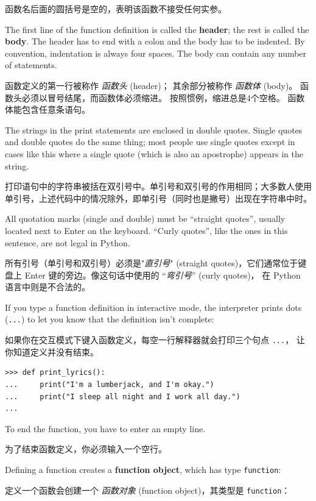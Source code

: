 函数名后面的圆括号是空的，表明该函数不接受任何实参。
  
    

The first line of the function definition is called the {\bf header};
the rest is called the {\bf body}.  The header has to end with a colon
and the body has to be indented.  By convention, indentation is
always four spaces.  The body can contain
any number of statements.

函数定义的第一行被称作 \emph{函数头} (header)； 其余部分被称作 \emph{函数体} (body)。
函数头必须以冒号结尾，而函数体必须缩进。 按照惯例，缩进总是4个空格。 函数体能包含任意条语句。

The strings in the print statements are enclosed in double
quotes.  Single quotes and double quotes do the same thing;
most people use single quotes except in cases like this where
a single quote (which is also an apostrophe) appears in the string.

打印语句中的字符串被括在双引号中。单引号和双引号的作用相同；大多数人使用单引号，上述代码中的情况除外，即单引号（同时也是撇号）出现在字符串中时。

All quotation marks (single and double)
must be ``straight quotes'', usually
located next to Enter on the keyboard.  ``Curly quotes'', like
the ones in this sentence, are not legal in Python.

所有引号（单引号和双引号）必须是"\emph{直引号}" (straight quotes)，它们通常位于键盘上 Enter 键的旁边。像这句话中使用的 ``\emph{弯引号}'' (curly quotes)， 在 Python 语言中则是不合法的。

If you type a function definition in interactive mode, the interpreter
prints dots ({\tt ...}) to let you know that the definition
isn't complete:

如果你在交互模式下键入函数定义，每空一行解释器就会打印三个句点 \lstinline{...}，
让你知道定义并没有结束。

\begin{lstlisting}
>>> def print_lyrics():
...     print("I'm a lumberjack, and I'm okay.")
...     print("I sleep all night and I work all day.")
...
\end{lstlisting}
%
To end the function, you have to enter an empty line.

为了结束函数定义，你必须输入一个空行。

Defining a function creates a {\bf function object}, which
has type \verb"function":

定义一个函数会创建一个 \emph{函数对象} (function object)，其类型是 \lstinline{function}：
  
  

